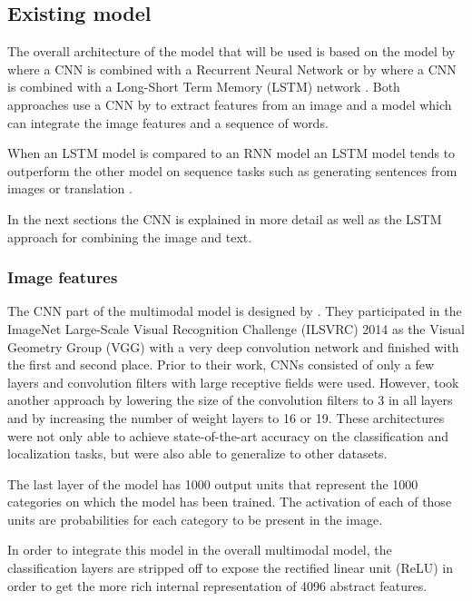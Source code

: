 \subsection{Existing model}
The overall architecture of the model that will be used is based on the model by \citeauthor{karpathyfeifei2014deep} where a CNN is combined with a Recurrent Neural Network \cite{karpathyfeifei2014deep} or by \citeauthor{vinyals2014show} where a CNN is combined with a Long-Short Term Memory (LSTM) network \cite{vinyals2014show}. Both approaches use a CNN by \citeauthor{simonyan2014very} \cite{simonyan2014very} to extract features from an image and a model which can integrate the image features and a sequence of words.  

When an LSTM model is compared to an RNN model an LSTM model tends to outperform the other model on sequence tasks such as generating sentences from images or translation \cite{vinyals2014show}. 

In the next sections the CNN is explained in more detail as well as the LSTM approach for combining the image and text.

\subsubsection{Image features}
The CNN part of the multimodal model is designed by \citeauthor{simonyan2014very}. They participated in the ImageNet Large-Scale Visual Recognition Challenge (ILSVRC) 2014 as the Visual Geometry Group (VGG) with a very deep convolution network and finished with the first and second place. Prior to their work, CNNs consisted of only a few layers and convolution filters with large receptive fields were used. However, \citeauthor{simonyan2014very} took another approach by lowering the size of the convolution filters to 3 in all layers and by increasing the number of weight layers to 16 or 19. These architectures were not only able to achieve state-of-the-art accuracy on the classification and localization tasks, but were also able to generalize to other datasets.

The last layer of the model has 1000 output units that represent the 1000 categories on which the model has been trained. The activation of each of those units are probabilities for each category to be present in the image. 

In order to integrate this model in the overall multimodal model, the classification layers are stripped off to expose the rectified linear unit (ReLU) in order to get the more rich internal representation of 4096 abstract features.

